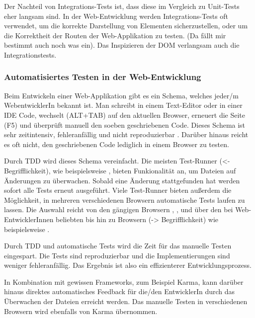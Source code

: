 Der Nachteil von Integrations-Tests ist, dass diese im Vergleich zu Unit-Tests eher langsam sind. In der Web-Entwicklung werden Integrations-Tests oft verwendet, um die korrekte Darstellung von Elementen sicherzustellen, oder um die Korrektheit der Routen der Web-Applikation zu testen. (Da fällt mir bestimmt auch noch was ein). Das Inspizieren der DOM verlangsam auch die Integrationstests.

\subsubsection{Automatisiertes Testen in der Web-Entwicklung}
Beim Entwickeln einer Web-Applikation gibt es ein Schema, welches jeder/m WebentwicklerIn bekannt ist. Man schreibt in einem Text-Editor oder in einer IDE Code, wechselt (ALT+TAB) auf den aktuellen Browser, erneuert die Seite (F5) und überprüft manuell den soeben geschriebenen Code. Dieses Schema ist sehr zeitintensiv, fehleranfällig und nicht reproduzierbar \autocite[3]{Johansen:2011}. Darüber hinaus reicht es oft nicht, den geschriebenen Code lediglich in einem Browser zu testen.

Durch TDD wird dieses Schema vereinfacht. Die meisten Test-Runner (<- Begrifflichkeit), wie beispielsweise , bieten Funkionalität an, um Dateien auf Änderungen zu überwachen. Sobald eine Änderung stattgefunden hat werden sofort alle Tests erneut ausgeführt. Viele Test-Runner bieten außerdem die Möglichkeit, in mehreren verschiedenen Browsern automatische Tests laufen zu lassen. Die Auswahl reicht von den gängigen Browsern , ,  und  über den bei Web-EntwicklerInnen beliebten  bis hin zu  Browsern (-> Begrifflichkeit) wie beispielsweise .

Durch TDD und automatische Tests wird die Zeit für das manuelle Testen eingespart. Die Tests sind reproduzierbar und die Implementierungen sind weniger fehleranfällig. Das Ergebnis ist also ein effizienterer Entwicklungsprozess.

In Kombination mit gewissen Frameworks, zum Beispiel Karma, kann darüber hinaus direktes automatisches Feedback für die/den EntwicklerIn durch das Überwachen der Dateien erreicht werden. Das manuelle Testen in verschiedenen Browsern wird ebenfalls von Karma übernommen.

